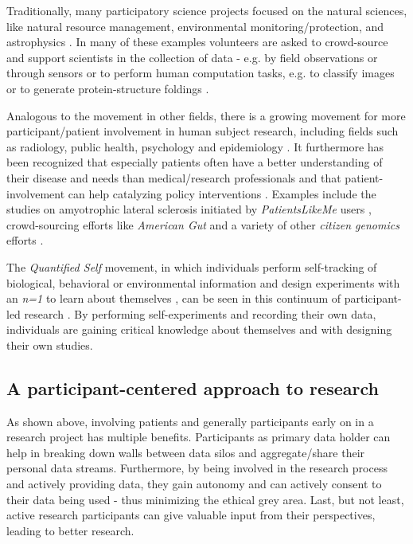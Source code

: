\documentclass[a4paper,num-refs]{oup-contemporary}
\begin{document}
Traditionally, many participatory science projects focused on the natural sciences, like natural resource management, environmental monitoring/protection, and astrophysics \cite{McKinley2017, Conrad2010, Zevin2017}. In many of these examples volunteers are asked to crowd-source and support scientists in the collection of data - e.g. by field observations or through sensors \cite{Haklay2012} or to perform human computation tasks, e.g. to classify images \cite{Dickinson2018} or to generate protein-structure foldings \cite{Khatib2011}. 

Analogous to the movement in other fields, there is a growing movement for more participant/patient involvement in human subject research, including fields such as radiology, public health, psychology and epidemiology \cite{Ranard2013, Rowbotham2017}. It furthermore has been recognized that especially patients often have a better understanding of their disease and needs than medical/research professionals \cite{Mader2018, Vayena2015} and that patient-involvement can help catalyzing policy interventions \cite{Katapally2018}. Examples include the studies on amyotrophic lateral sclerosis initiated by \textit{PatientsLikeMe} users \cite{Wicks2011}, crowd-sourcing efforts like \textit{American Gut} \cite{McDonald2018} and a variety of other \textit{citizen genomics} efforts \cite{McGowan2017}.

The \textit{Quantified Self} movement, in which individuals perform self-tracking of biological, behavioral or environmental information and design experiments with an \textit{n=1} to learn about themselves \cite{Swan2013}, can be seen in this continuum of participant-led research \cite{Swan2012}. By performing self-experiments and recording their own data, individuals are gaining critical knowledge about themselves and with designing their own studies.

\subsection{A participant-centered approach to research}
As shown above, involving patients and generally participants early on in a research project has multiple benefits. Participants as primary data holder can help in breaking down walls between data silos and aggregate/share their personal data streams. Furthermore, by being involved in the research process and actively providing data, they gain autonomy and can actively consent to their data being used - thus minimizing the ethical grey area. Last, but not least, active research participants can give valuable input from their perspectives, leading to better research.
\end{document}
